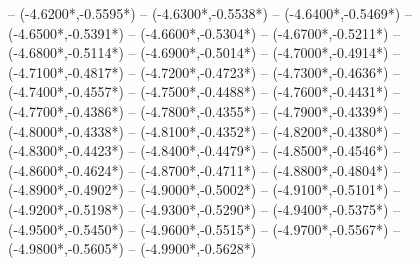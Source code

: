 {	-- ({-4.6200*\dx},{-0.5595*\dy})
	-- ({-4.6300*\dx},{-0.5538*\dy})
	-- ({-4.6400*\dx},{-0.5469*\dy})
	-- ({-4.6500*\dx},{-0.5391*\dy})
	-- ({-4.6600*\dx},{-0.5304*\dy})
	-- ({-4.6700*\dx},{-0.5211*\dy})
	-- ({-4.6800*\dx},{-0.5114*\dy})
	-- ({-4.6900*\dx},{-0.5014*\dy})
	-- ({-4.7000*\dx},{-0.4914*\dy})
	-- ({-4.7100*\dx},{-0.4817*\dy})
	-- ({-4.7200*\dx},{-0.4723*\dy})
	-- ({-4.7300*\dx},{-0.4636*\dy})
	-- ({-4.7400*\dx},{-0.4557*\dy})
	-- ({-4.7500*\dx},{-0.4488*\dy})
	-- ({-4.7600*\dx},{-0.4431*\dy})
	-- ({-4.7700*\dx},{-0.4386*\dy})
	-- ({-4.7800*\dx},{-0.4355*\dy})
	-- ({-4.7900*\dx},{-0.4339*\dy})
	-- ({-4.8000*\dx},{-0.4338*\dy})
	-- ({-4.8100*\dx},{-0.4352*\dy})
	-- ({-4.8200*\dx},{-0.4380*\dy})
	-- ({-4.8300*\dx},{-0.4423*\dy})
	-- ({-4.8400*\dx},{-0.4479*\dy})
	-- ({-4.8500*\dx},{-0.4546*\dy})
	-- ({-4.8600*\dx},{-0.4624*\dy})
	-- ({-4.8700*\dx},{-0.4711*\dy})
	-- ({-4.8800*\dx},{-0.4804*\dy})
	-- ({-4.8900*\dx},{-0.4902*\dy})
	-- ({-4.9000*\dx},{-0.5002*\dy})
	-- ({-4.9100*\dx},{-0.5101*\dy})
	-- ({-4.9200*\dx},{-0.5198*\dy})
	-- ({-4.9300*\dx},{-0.5290*\dy})
	-- ({-4.9400*\dx},{-0.5375*\dy})
	-- ({-4.9500*\dx},{-0.5450*\dy})
	-- ({-4.9600*\dx},{-0.5515*\dy})
	-- ({-4.9700*\dx},{-0.5567*\dy})
	-- ({-4.9800*\dx},{-0.5605*\dy})
	-- ({-4.9900*\dx},{-0.5628*\dy})
}

